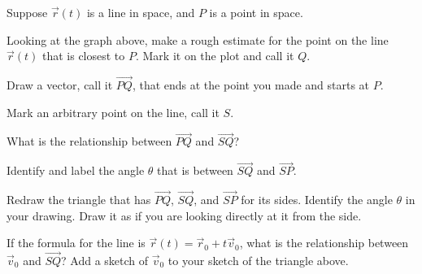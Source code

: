 \begin{problem}

\item Suppose $\vec{r}(t)$ is a line in space, and $P$ is a point in space.


  \begin{subproblem}
    \item Looking at the graph above, make a rough estimate for the point on the line $\vec{r}(t)$ that is closest to $P$. Mark it on the plot and call it $Q$.
    \item Draw a vector, call it $\overrightarrow{PQ}$, that ends at the point you made and starts at $P$.
    \item Mark an arbitrary point on the line, call it $S$.
    \item What is the relationship between $\overrightarrow{PQ}$ and $\overrightarrow{SQ}$?
      \vfill
    \item Identify and label the angle $\theta$ that is between $\overrightarrow{SQ}$ and $\overrightarrow{SP}$.

    \clearpage

    \item Redraw the triangle that has $\overrightarrow{PQ}$, $\overrightarrow{SQ}$, and $\overrightarrow{SP}$ for its sides.
       Identify the angle $\theta$ in your drawing. Draw it as if you are looking directly at it from the side.
      \vfill

    \item If the formula for the line is $\vec{r}(t)=\vec{r}_0 + t \vec{v}_0$, what is the relationship between $\vec{v}_0$ and $\overrightarrow{SQ}$?
          Add  a sketch of $\vec{v}_0$ to your sketch of the triangle above.
      \vspace{3em}


\end{subproblem}
\end{problem}
